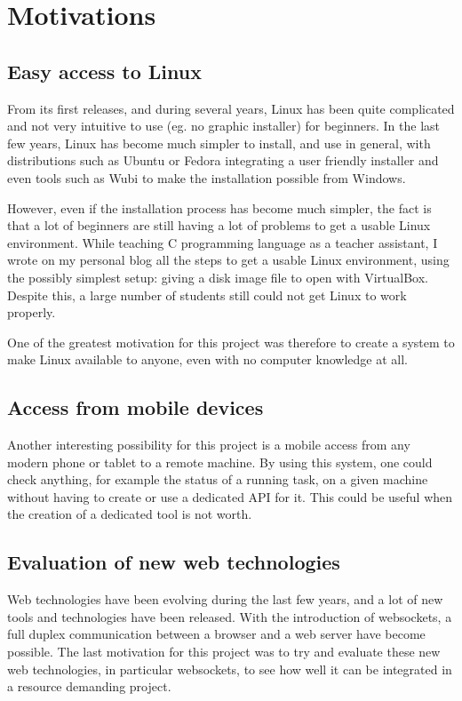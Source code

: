 \section{Motivations}
\subsection{Easy access to Linux}
From its first releases, and during several years, Linux has been quite 
complicated and not very intuitive to use (eg. no graphic installer) for beginners.
In the last few years, Linux has become much simpler to install, and use in general, 
with distributions such as Ubuntu or Fedora integrating a user friendly installer 
and even tools such as Wubi to make the installation possible from Windows.

However, even if the installation process has become much simpler, the fact is that 
a lot of beginners are still having a lot of problems to get a usable Linux environment. 
While teaching C programming language as a teacher assistant, I wrote 
on my personal blog all the steps to get a usable Linux environment, using the 
possibly simplest setup: giving a disk image file to open with VirtualBox. 
Despite this, a large number of students still could not get Linux to work properly.

One of the greatest motivation for this project was therefore to create a system to 
make Linux available to anyone, even with no computer knowledge at all.
%
\subsection{Access from mobile devices}
Another interesting possibility for this project is a mobile access from any modern 
phone or tablet to a remote machine. By using this system, one could check anything,
for example the status of a running task,  on a given machine without having 
to create or use a dedicated API for it. This could be useful when the creation of 
a dedicated tool is not worth.
%
\subsection{Evaluation of new web technologies }
Web technologies have been evolving during the last few years, and a lot 
of new tools and technologies have been released. With the introduction of 
websockets, a full duplex communication between a browser and a web server 
have become possible. 
The last motivation for this project was to try and evaluate these new web 
technologies, in particular websockets, to see how well it can be integrated 
in a resource demanding project.


